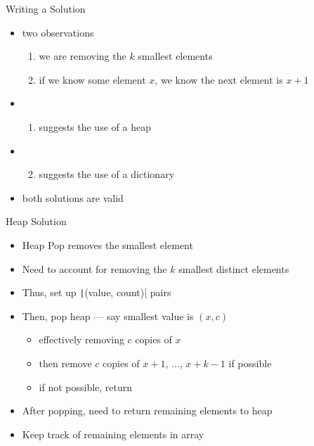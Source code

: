 \begin{frame}{Writing a Solution}
    \pause
    \begin{itemize}[<+->]
        \item two observations
              \begin{enumerate}[<+->]
                  \item we are removing the $k$ smallest elements
                  \item if we know some element $x$, we know the next element is $x + 1$
              \end{enumerate}
        \item \begin{enumerate}\item suggests the use of a heap\end{enumerate}
        \item \begin{enumerate}\setcounter{enumi}{1}\item suggests the use of a dictionary\end{enumerate}
        \item both solutions are valid
    \end{itemize}
\end{frame}

\begin{frame}{Heap Solution}
    \pause
    \begin{itemize}[<+->]
        \item Heap Pop removes the smallest element
        \item Need to account for removing the $k$ smallest \alert{distinct} elements
        \item Thus, set up \texttt|(value, count)| pairs
        \item Then, pop heap --- say smallest value is $(x, c)$
              \begin{itemize}[<+->]
                  \item effectively removing $c$ copies of $x$
                  \item then remove $c$ copies of $x + 1$, $\dots$, $x + k - 1$ if possible
                  \item if not possible, return \PyFalse
              \end{itemize}
        \item After popping, need to return remaining elements to heap
        \item Keep track of remaining elements in array
    \end{itemize}
\end{frame}


